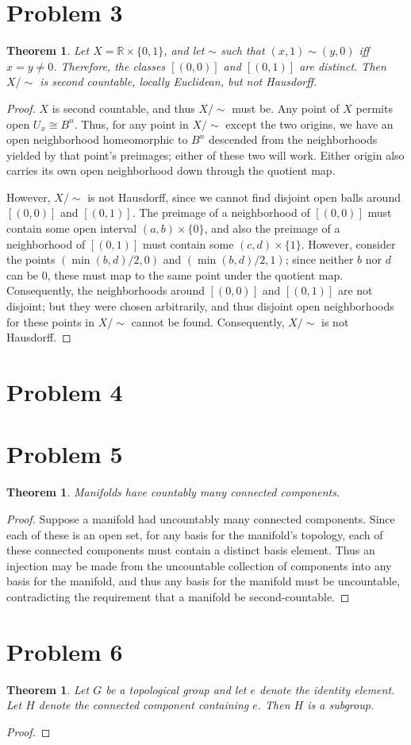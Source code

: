 \documentclass{article}
\newtheorem{theorem}[subsection]{Theorem}
\theoremstyle{definition}
\newcommand{\R}{\mathbb{R}}
\begin{document}
\section{Problem 3}
\begin{theorem}
Let $X=\R \times \{0,1\}$, and let $\sim$ such that $(x,1) \sim (y,0)$ iff 
$x=y \neq 0$. Therefore, the classes $[(0,0)]$ and $[(0,1)]$ are distinct.
Then $X / \sim$ is second countable, locally Euclidean, but not Hausdorff.
\end{theorem}
\begin{proof}
$X$ is second countable, and thus $X / \sim$ must be. Any point of $X$ 
permits open $U_x \cong B^n$. Thus, for any point in $X/ \sim$ except
the two origins, we have an open neighborhood homeomorphic to $B^n$ 
descended from the neighborhoods yielded by that point's preimages;
either of these two will work. Either origin also carries its own open
neighborhood down through the quotient map.

However, $X / \sim$ is not Hausdorff, since we cannot find disjoint 
open balls around $[(0,0)]$ and $[(0,1)]$. The preimage of a neighborhood
of $[(0,0)]$ must contain some open interval $(a,b) \times \{0\}$,
and also the preimage of a neighborhood of $[(0,1)]$ must contain
some $(c,d) \times \{1\}$. However, consider the points 
$(\min(b,d)/2,0)$ and $(\min(b,d)/2,1)$; since neither $b$ nor $d$ can
be $0$, these must map to the same point under the quotient map. 
Consequently, the neighborhoods around $[(0,0)]$ and $[(0,1)]$ are
not disjoint; but they were chosen arbitrarily, and thus disjoint
open neighborhoods for these points in $X / \sim$ cannot be found.
Consequently, $X / \sim$ is not Hausdorff.
\end{proof}
\section{Problem 4}
\section{Problem 5}
\begin{theorem}
Manifolds have countably many connected components.
\end{theorem}
\begin{proof}
Suppose a manifold had uncountably many connected components. Since each
of these is an open set, for any basis for the manifold's topology, 
each of these connected components must contain a distinct basis
element. Thus an injection may be made from the uncountable collection
of components into any basis for the manifold, and thus any basis
for the manifold must be uncountable, contradicting the requirement
that a manifold be second-countable.
\end{proof}
\section{Problem 6}
\begin{theorem}
Let $G$ be a topological group and let $e$ denote the identity element. 
Let $H$ denote the connected component containing $e$. Then $H$ is a 
subgroup.
\end{theorem}
\begin{proof}

\end{proof}
\end{document}
